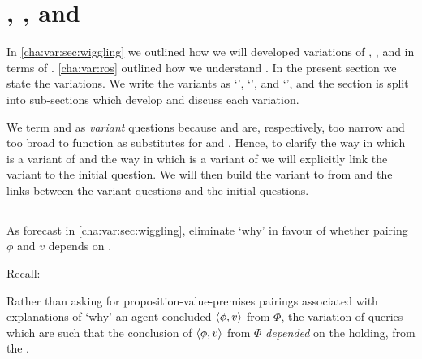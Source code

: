 \section{\qWhyV{}, \qHowV{}, and \issueConstraint{}}
\label{cha:var:sec:vars}

\begin{note}
  In \autoref{cha:var:sec:wiggling} we outlined how we will developed variations of \qWhy{}, \qHow{}, and \issueInclusion{} in terms of \ros{}.
  \autoref{cha:var:ros} outlined how we understand .
  In the present section we state the variations.
  We write the variants as `\qWhyV{}', `\qHowV{}', and `\issueConstraint{}', and the section is split into sub-sections which develop and discuss each variation.


  We term \qWhyV{} and \qHowV{} as \emph{variant} questions because \qWhyV{} and \qHowV{} are, respectively, too narrow and too broad to function as substitutes for \qWhy{} and \qHow{}.
  Hence, to clarify the way in which \qWhyV{} is a variant of \qWhy{} and the way in which \qHowV{} is a variant of \qHow{} we will explicitly link the variant to the initial question.
  We will then build the variant to \issueInclusion{} from \issueInclusion{} and the links between the variant questions and the initial questions.
\end{note}

\subsection{\qWhyV{}}
\label{cha:var:sec:vars:qwhyvnp}

\begin{note}
  As forecast in \autoref{cha:var:sec:wiggling}, eliminate `why' in favour of whether pairing \(\phi\) and \(v\) depends on \ros{}.

  Recall:
  \begin{quote}%
    \vspace{-1.5\baselineskip}%
    \questionWhyBasic*
  \end{quote}

  Rather than asking for proposition-value-premises pairings associated with explanations of `why' an agent concluded \(\langle \phi, v \rangle\) from \(\Phi\), the variation of \qWhy{} queries which  are such that the conclusion of \(\langle \phi, v \rangle\) from \(\Phi\) \emph{depended} on the  holding, from the \agpe{}.
  \end{note}


